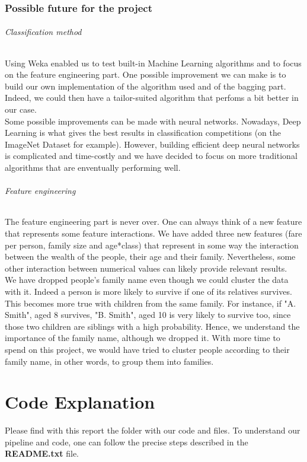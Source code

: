 \documentclass[11pt,a4paper,portrait]{article}
\begin{document}
\section{Possible future for the project}
\paragraph{Classification method}
Using Weka enabled us to test built-in Machine Learning algorithms and to focus on the feature engineering part. One possible improvement we can make is to build our own implementation of the algorithm used and of the bagging part. Indeed, we could then have a tailor-suited algorithm that perfoms a bit better in our case.\\ Some possible improvements can be made with neural networks. Nowadays, Deep Learning is what gives the best results in classification competitions (on the ImageNet Dataset for example). However, building efficient deep neural networks is complicated and time-costly and we have decided to focus on more traditional algorithms that are enventually performing well.

\paragraph{Feature engineering}
The feature engineering part is never over. One can always think of a new feature that represents some feature interactions. We have added three new features (fare per person, family size and  age*class) that represent in some way the interaction between the wealth of the people, their age and their family. Nevertheless, some other interaction between numerical values can likely provide relevant results.\\
We have dropped people's family name even though we could cluster the data with it. Indeed a person is more likely to survive if one of its relatives survives. This becomes more true with children from the same family. For instance, if "A. Smith", aged 8 survives, "B. Smith", aged 10 is very likely to survive too, since those two children are siblings with a high probability. Hence, we understand the importance of the family name, although we dropped it. With more time to spend on this project, we would have tried to cluster people according to their family name, in other words, to group them into families.

\part*{Code Explanation}
Please find with this report the folder with our code and files. To understand our pipeline and code, one can follow the precise steps described in the \textbf{README.txt} file.
\end{document}
